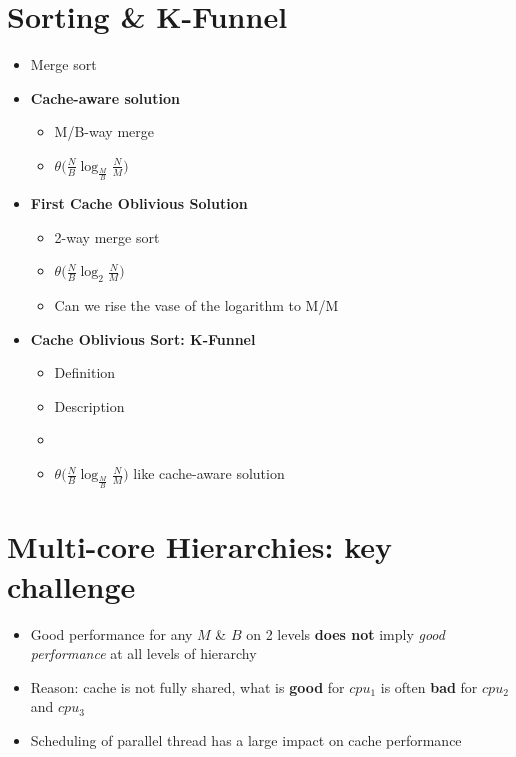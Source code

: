 \documentclass[12pt,oneside]{report}
\begin{document}
\section{Sorting \& K-Funnel}
\begin{itemize}
    \item Merge sort
    \item \textbf{Cache-aware solution}
    \begin{itemize}
        \item M/B-way merge
        \item \(\theta\Big(\frac{N}{B}\log_{\frac{M}{B}}\frac{N}{M}\Big)\)
    \end{itemize}
    \item \textbf{First Cache Oblivious Solution}
    \begin{itemize}
        \item 2-way merge sort
        \item \(\theta\Big(\frac{N}{B}\log_2\frac{N}{M}\Big)\)
        \item Can we rise the vase of the logarithm to M/M
    \end{itemize}
    \item \textbf{Cache Oblivious Sort: K-Funnel}
    \begin{itemize}
        \item Definition
        \item Description
        \item \item \(\theta\Big(\frac{N}{B}\log_{\frac{M}{B}}\frac{N}{M}\Big)\) like cache-aware solution
    \end{itemize}
\end{itemize}

\section{Multi-core Hierarchies: key challenge}
\begin{itemize}
    \item Good performance for any \(M\) \& \(B\) on 2 levels \textbf{does not} imply \textit{good performance} at all levels of hierarchy
    \item Reason: cache is not fully shared, what is \textbf{good} for \(cpu_1\) is often \textbf{bad} for \(cpu_2\) and \(cpu_3\)
    \item Scheduling of parallel thread has a large impact on cache performance
\end{itemize}
\end{document}
